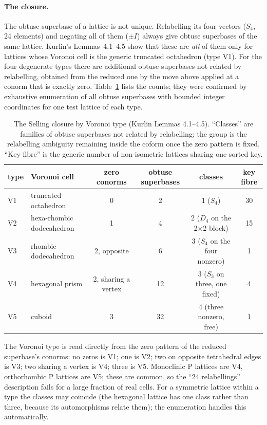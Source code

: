 \documentclass[11pt]{article}
\begin{document}
\paragraph{The closure.}
The obtuse superbase of a lattice is not unique. Relabelling its four vectors ($S_4$, 24 elements) and negating all of them ($\pm I$) always give obtuse superbases of the same lattice. Kurlin's Lemmas~4.1--4.5 show that these are \emph{all} of them only for lattices whose Voronoi cell is the generic truncated octahedron (type V1). For the four degenerate types there are additional obtuse superbases not related by relabelling, obtained from the reduced one by the move above applied at a conorm that is exactly zero. Table~\ref{tab:closure} lists the counts; they were confirmed by exhaustive enumeration of all obtuse superbases with bounded integer coordinates for one test lattice of each type.

\begin{table}[h]
\centering
\caption{The Selling closure by Voronoi type (Kurlin Lemmas 4.1--4.5). ``Classes'' are families of obtuse superbases not related by relabelling; the group is the relabelling ambiguity remaining inside the coform once the zero pattern is fixed. ``Key fibre'' is the generic number of non-isometric lattices sharing one sorted key.}
\label{tab:closure}
\begin{tabular}{llcccc}
\toprule
type & Voronoi cell & zero conorms & obtuse superbases & classes & key fibre \\
\midrule
V1 & truncated octahedron & 0 & 2 & 1 ($S_4$) & 30 \\
V2 & hexa-rhombic dodecahedron & 1 & 4 & 2 ($D_4$ on the 2$\times$2 block) & 15 \\
V3 & rhombic dodecahedron & 2, opposite & 6 & 3 ($S_4$ on the four nonzero) & 1 \\
V4 & hexagonal prism & 2, sharing a vertex & 12 & 3 ($S_3$ on three, one fixed) & 4 \\
V5 & cuboid & 3 & 32 & 4 (three nonzero, free) & 1 \\
\bottomrule
\end{tabular}
\end{table}

The Voronoi type is read directly from the zero pattern of the reduced superbase's conorms: no zeros is V1; one is V2; two on opposite tetrahedral edges is V3; two sharing a vertex is V4; three is V5. Monoclinic P lattices are V4, orthorhombic P lattices are V5; these are common, so the ``24 relabellings'' description fails for a large fraction of real cells. For a symmetric lattice within a type the classes may coincide (the hexagonal lattice has one class rather than three, because its automorphisms relate them); the enumeration handles this automatically.
\end{document}
